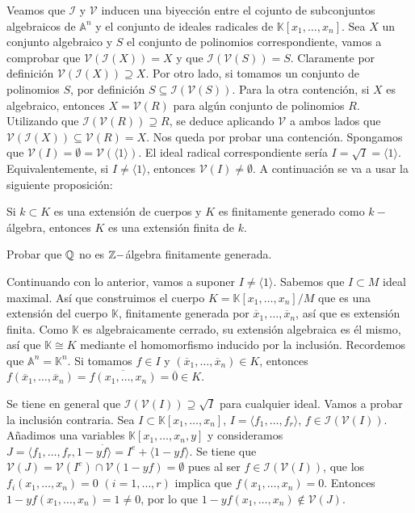\documentclass[ACGA.tex]{subfiles}
\begin{document}
Veamos que $\mathcal{I}$ y $\mathcal{V}$ inducen una biyección entre el cojunto de subconjuntos algebraicos de $\mathbb{A}^n$ y el conjunto de ideales radicales de $\mathbb{K}[x_1,\dots,x_n]$. Sea $X$ un conjunto algebraico y $S$ el conjunto de polinomios correspondiente, vamos a comprobar que $\mathcal{V}(\mathcal{I}(X))=X$ y que $\mathcal{I}(\mathcal{V}(S))=S$. Claramente por definición $\mathcal{V}(\mathcal{I}(X))\supseteq X$. Por otro lado, si tomamos un conjunto de polinomios $S$, por definición $S\subseteq \mathcal{I}(\mathcal{V}(S))$. Para la otra contención, si $X$ es algebraico, entonces $X=\mathcal{V}(R)$ para algún conjunto de polinomios $R$. Utilizando que $\mathcal{I}(\mathcal{V}(R))\supseteq R$, se deduce aplicando $\mathcal{V}$ a ambos lados que $\mathcal{V}(\mathcal{I}(X))\subseteq \mathcal{V}(R)=X$. Nos queda por probar una contención. Spongamos que $\mathcal{V}(I)=\emptyset=\mathcal{V}(\langle 1\rangle)$. El ideal radical correspondiente sería $I=\sqrt{I}=\langle1 \rangle$. Equivalentemente, si $I\neq\langle 1\rangle$, entonces $\mathcal{V}(I)\neq\emptyset$. A continuación se va a usar la siguiente proposición:
\begin{prop}
Si $k\subset K$ es una extensión de cuerpos y $K$ es finitamente generado como $k-$álgebra, entonces $K$ es una extensión finita de $k$. 
\end{prop}

\begin{ejer}
Probar que $\mathbb{Q}$ no es $\mathbb{Z}-$álgebra finitamente generada. 
\end{ejer}

Continuando con lo anterior, vamos a suponer $I\neq\langle 1\rangle$. Sabemos que $I\subset M$ ideal maximal. Así que construimos el cuerpo $K=\mathbb{K}[x_1,\dots,x_n]/M$ que es una extensión del cuerpo $\mathbb{K}$, finitamente generada por $\overline{x}_1,\dots, \overline{x}_n$, así que es extensión finita. Como $\mathbb{K}$ es algebraicamente cerrado, su extensión algebraica es él mismo, así que $\mathbb{K}\cong K$ mediante el homomorfismo inducido por la inclusión. Recordemos que $\mathbb{A}^n=\mathbb{K}^n$. Si tomamos $f\in I$ y $(\overline{x}_1,\dots, \overline{x}_n)\in K$, entonces $f(\overline{x}_1,\dots, \overline{x}_n)=\overline{f(x_1,\dots,x_n)}=\overline{0}\in K$. 

Se tiene en general que $\mathcal{I}(\mathcal{V}(I))\supseteq\sqrt{I}$ para cualquier ideal. Vamos a probar la inclusión contraria. Sea $I\subset \mathbb{K}[x_1,\dotsc,x_n]$, $I=\langle f_1,\dotsc,f_r\rangle$, $f\in \mathcal{I}(\mathcal{V}(I))$. Añadimos una variables $\mathbb{K}[x_1,\dotsc,x_n,y]$ y consideramos $J=\langle f_1,\dotsc,f_r,1-y\dot f\rangle = I^e + \langle 1-yf\rangle$. Se tiene que $\mathcal{V}(J) = \mathcal{V}(I^e) \cap \mathcal{V}(1-yf)=\emptyset$ pues al ser $f\in \mathcal{I}(\mathcal{V}(I))$, que los $f_i(x_1,\dots, x_n)=0$ $(i=1,\dots,r)$ implica que $f(x_1,\dotsc,x_n)=0$. Entonces $1-yf(x_1,\dotsc,x_n) = 1\neq 0$, por lo que $1-yf(x_1,\dotsc,x_n)\notin\mathcal{V}(J)$. 
\end{document}
